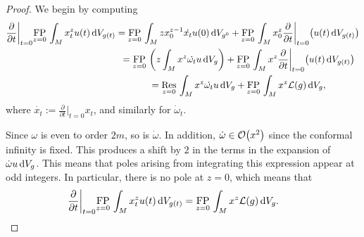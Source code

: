 \documentclass[pdftex]{sigma}
\numberwithin{equation}{section}
\newcommand{\gin}{{g^0}}
\newcommand{\FP}{\underset{z=0}{\operatorname{FP}}\,}
\newcommand{\Res}{\underset{z=0}{\operatorname{Res}}\,}
\begin{document}
\begin{proof}We begin by computing
\begin{gather*}%
\frac{\partial}{\partial t} \bigg \vert_{t=0}\FP \int_M x_t^z u(t) \, {\rm d}V_{g(t)} = \FP \int_M z x^{z-1}_0 \dot{x_t} u(0) \, {\rm d}V_{\gin} +\FP \int_M x^z_0 \frac{\partial}{\partial t}\bigg \vert_{t=0}\big( u(t) \, {\rm d}V_{g(t)}\big ) \\
\hphantom{\frac{\partial}{\partial t} \bigg \vert_{t=0}\FP \int_M x_t^z u(t) \, {\rm d}V_{g(t)}}{}
= \FP \left ( z\int_M x^{z} \dot{\omega_t} u \, {\rm d}V_{g}\right ) + \FP \int_M x^z \frac{\partial}{\partial t}\bigg \vert_{t=0}\big( u(t) \, {\rm d}V_{g(t)}\big )\\
\hphantom{\frac{\partial}{\partial t} \bigg \vert_{t=0}\FP \int_M x_t^z u(t) \, {\rm d}V_{g(t)}}{}
= \Res \int_M x^{z} \dot{\omega_t} u \, {\rm d}V_{g} + \FP \int_M x^z {\cal L}(g) \, {\rm d}V_{g} ,
\end{gather*}
where $\dot{x_t}:=\frac{\partial}{\partial t}\big \vert_{t=0}x_t$, and similarly for $\dot{\omega}_t$.

Since $\omega$ is even to order $2m$, so is ${\dot \omega}$. In addition, ${\dot \omega}\in{\cal O}\big(x^2\big)$ since the conformal infinity is fixed.
This produces a shift by $2$ in the terms in the expansion of ${\dot \omega}u\, {\rm d}V_g$. This means that poles arising from integrating this expression
appear at odd integers. In particular, there is no pole at $z=0$, which means that
\begin{gather*}
\frac{\partial}{\partial t} \bigg \vert_{t=0}\FP \int_M x_t^z u(t)\,{\rm d}V_{g(t)} = \FP \int_M x^z {\cal L}(g) \,{\rm d} V_{g} .\tag*{\qed}
\end{gather*}\renewcommand{\qed}{}
\end{proof}
\end{document}
